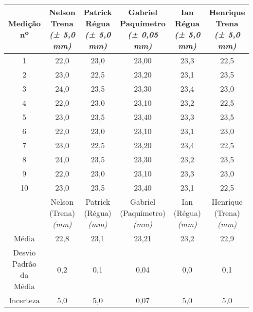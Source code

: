 \documentclass{article}
\begin{document}
\begin{table}[h!]
\centering
\begin{tabular}{c c c c c c }
\toprule
Medição nº & \shortstack{Nelson\\Trena\\\textit{(± 5,0 mm)}} & \shortstack{Patrick\\Régua\\\textit{(± 5,0 mm)}} & \shortstack{Gabriel\\Paquímetro\\\textit{(± 0,05 mm)}} & \shortstack{Ian\\Régua\\\textit{(± 5,0 mm)}} & \shortstack{Henrique\\Trena\\\textit{(± 5,0 mm)}}\\
\midrule
1 & 22,0 & 23,0 & 23,00 & 23,3 & 22,5\\
2 & 23,0 & 22,5 & 23,20 & 23,1 & 23,5\\
3 & 24,0 & 23,5 & 23,30 & 23,4 & 23,0\\
4 & 22,0 & 23,0 & 23,10 & 23,2 & 22,5\\
5 & 23,0 & 23,5 & 23,40 & 23,3 & 23,5\\
6 & 22,0 & 23,0 & 23,10 & 23,1 & 23,0\\
7 & 23,0 & 22,5 & 23,20 & 23,4 & 22,5\\
8 & 24,0 & 23,5 & 23,30 & 23,2 & 23,5\\
9 & 22,0 & 23,0 & 23,10 & 23,3 & 23,0\\
10 & 23,0 & 23,5 & 23,40 & 23,1 & 22,5\\
\midrule
&\shortstack{Nelson\\(Trena)\\\textit{(mm)}} & \shortstack{Patrick\\(Régua)\\\textit{(mm)}} & \shortstack{Gabriel\\(Paquímetro)\\\textit{(mm)}} & \shortstack{Ian\\(Régua)\\\textit{(mm)}} & \shortstack{Henrique\\(Trena)\\\textit{(mm)}}\\
\midrule
Média & 22,8 & 23,1 & 23,21 & 23,2 & 22,9\\[3pt]
\shortstack{Desvio\\Padrão da\\Média} & 0,2 & 0,1 & 0,04 & 0,0 & 0,1\\[3pt]
Incerteza & 5,0 & 5,0 & 0,07 & 5,0 & 5,0\\
\bottomrule
\end{tabular}
\end{table}
\end{document}
